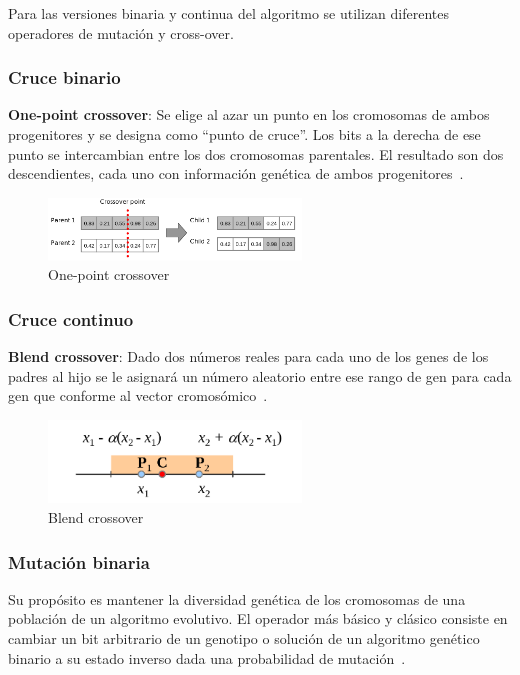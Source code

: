 Para las versiones binaria y continua del algoritmo se utilizan diferentes operadores de mutación y cross-over.

\subsubsection{Cruce binario}
\textbf{One-point crossover}: Se elige al azar un punto en los cromosomas de ambos progenitores y se designa como ``punto de cruce''. Los bits a la derecha de ese punto se intercambian entre los dos cromosomas parentales. El resultado son dos descendientes, cada uno con información genética de ambos progenitores~\cite{DAGDIA2020283}.
\begin{figure}[htp]
    \begin{center}
        \includegraphics[width=0.6\textwidth]{imagenes/one-point-crossover.png}
    \end{center}
    \caption[One point crossover]{One-point crossover~\cite{purduelecture}}
\end{figure}

\subsubsection{Cruce continuo}
\textbf{Blend crossover}: Dado dos números reales para cada uno de los genes de los padres al hijo se le asignará un número aleatorio entre ese rango de gen para cada gen que conforme al vector cromosómico~\cite{purduelecture}.
\begin{figure}[htp]
    \begin{center}
        \includegraphics[width=0.6\textwidth]{imagenes/blend-crossover.png}
    \end{center}
    \caption[Blend crossover]{Blend crossover~\cite{purduelecture}}
\end{figure}

\subsubsection{Mutación binaria}
Su propósito es mantener la diversidad genética de los cromosomas de una población de un algoritmo evolutivo.
El operador más básico y clásico consiste en cambiar un bit arbitrario de un genotipo o solución de un algoritmo genético binario a su estado inverso dada una probabilidad de mutación~\cite{mirjalili2019genetic}.

